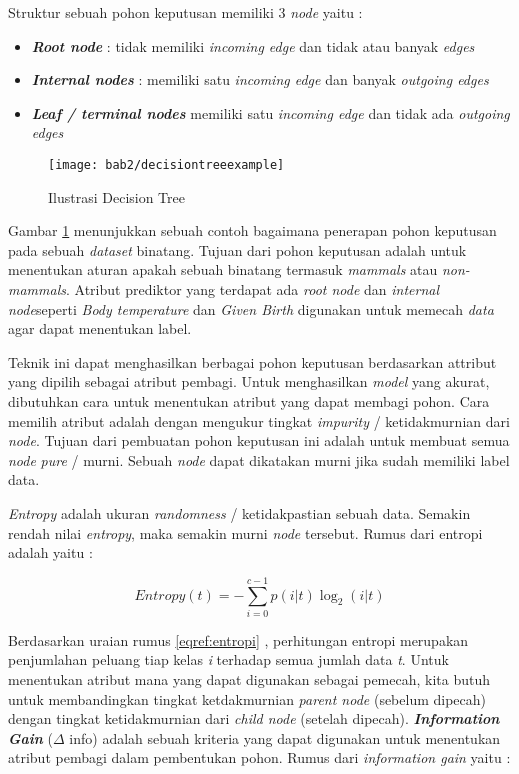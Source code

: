 Struktur sebuah pohon keputusan memiliki 3 \textit{node} yaitu : 
\begin{itemize}
\item \textbf{\textit{Root node}} : tidak memiliki \textit{incoming edge} dan tidak atau banyak \textit{edges}
\item \textbf{\textit{Internal nodes}} : memiliki satu \textit{incoming edge} dan banyak \textit{outgoing edges} 
\item \textbf{\textit{Leaf / terminal nodes}} memiliki satu \textit{incoming edge} dan tidak ada \textit{outgoing edges}
\end{itemize}
\pagebreak
\begin{figure}[h!]
	\centering  
	\texttt{[image: bab2/decisiontreeexample]}   
	\caption{Ilustrasi Decision Tree}
	\label{fig:decisiontreeexample} 
\end{figure} 

Gambar \ref{fig:decisiontreeexample} menunjukkan sebuah contoh bagaimana penerapan pohon keputusan pada sebuah \textit{dataset} binatang. Tujuan dari pohon keputusan adalah untuk menentukan aturan apakah sebuah binatang termasuk \textit{mammals} atau \textit{non-mammals}. Atribut prediktor yang terdapat ada \textit{root node} dan \textit{internal node}seperti \textit{Body temperature} dan \textit{Given Birth} digunakan untuk memecah \textit{data} agar dapat menentukan label. 


Teknik ini dapat menghasilkan berbagai pohon keputusan berdasarkan attribut yang dipilih sebagai atribut pembagi. Untuk menghasilkan \textit{model} yang akurat, dibutuhkan cara untuk menentukan atribut yang dapat membagi pohon. Cara memilih atribut adalah dengan mengukur tingkat \textit{impurity} / ketidakmurnian dari \textit{node}. Tujuan dari pembuatan pohon keputusan ini adalah untuk membuat semua \textit{node} \textit{pure} / murni. Sebuah \textit{node} dapat dikatakan murni jika sudah memiliki label data. 

\textit{Entropy} adalah ukuran \textit{randomness} / ketidakpastian sebuah data. Semakin rendah nilai \textit{entropy}, maka semakin murni \textit{node} tersebut. Rumus dari entropi adalah yaitu :

\begin{equation}
Entropy(t) = - \sum_{i=0}^{c-1} p(i|t)\log_2 (i|t)
\label{eqref:entropi}
\end{equation}

Berdasarkan uraian rumus \eqref{eqref:entropi} , perhitungan entropi merupakan penjumlahan peluang tiap kelas  \textit{i} terhadap semua jumlah data \textit{t}. Untuk menentukan atribut mana yang dapat digunakan sebagai pemecah, kita butuh untuk membandingkan tingkat ketdakmurnian \textit{parent node} (sebelum dipecah) dengan  tingkat ketidakmurnian dari \textit{child node} (setelah dipecah).  \textit{\textbf{Information Gain}} ($\Delta$ info) adalah sebuah kriteria yang dapat digunakan untuk menentukan atribut pembagi dalam pembentukan pohon. Rumus dari \textit{information gain}  yaitu : 

